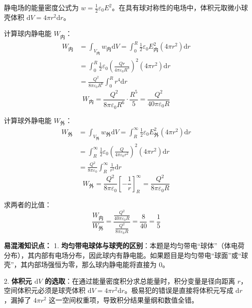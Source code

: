 静电场的能量密度公式为 $w = \frac{1}{2}\varepsilon_0 E^2$。在具有球对称性的电场中，体积元取微小球壳体积 $\mathrm{d}V = 4\pi r^2 \mathrm{d}r$。

计算球内静电能 $W_{\text{内}}$：
\begin{align*}
	W_{\text{内}} &= \int_{V_{\text{内}}} w_{\text{内}} \mathrm{d}V = \int_{0}^{R} \frac{1}{2}\varepsilon_0 E_{\text{内}}^2 (4\pi r^2) \mathrm{d}r \\
	&= \int_{0}^{R} \frac{1}{2}\varepsilon_0 \left( \frac{Qr}{4\pi\varepsilon_0 R^3} \right)^2 (4\pi r^2) \mathrm{d}r \\
	&= \frac{Q^2}{8\pi\varepsilon_0 R^6} \int_{0}^{R} r^4 \mathrm{d}r
\end{align*}
\begin{equation}\label{eq:8-5-3}
	W_{\text{内}} = \frac{Q^2}{8\pi\varepsilon_0 R^6} \cdot \frac{R^5}{5} = \frac{Q^2}{40\pi\varepsilon_0 R}
\end{equation}

计算球外静电能 $W_{\text{外}}$：
\begin{align*}
	W_{\text{外}} &= \int_{V_{\text{外}}} w_{\text{外}} \mathrm{d}V = \int_{R}^{\infty} \frac{1}{2}\varepsilon_0 E_{\text{外}}^2 (4\pi r^2) \mathrm{d}r \\
	&= \int_{R}^{\infty} \frac{1}{2}\varepsilon_0 \left( \frac{Q}{4\pi\varepsilon_0 r^2} \right)^2 (4\pi r^2) \mathrm{d}r \\
	&= \frac{Q^2}{8\pi\varepsilon_0} \int_{R}^{\infty} \frac{1}{r^2} \mathrm{d}r
\end{align*}
\begin{equation}\label{eq:8-5-4}
	W_{\text{外}} = \frac{Q^2}{8\pi\varepsilon_0} \left[ -\frac{1}{r} \right]_{R}^{\infty} = \frac{Q^2}{8\pi\varepsilon_0 R}
\end{equation}

求两者的比值：
\begin{equation}\label{eq:8-5-5}
	\frac{W_{\text{内}}}{W_{\text{外}}} = \frac{\frac{Q^2}{40\pi\varepsilon_0 R}}{\frac{Q^2}{8\pi\varepsilon_0 R}} = \frac{8}{40} = \frac{1}{5}
\end{equation}

\textbf{易混淆知识点： }
1. \textbf{均匀带电球体与球壳的区别}：本题是均匀带电“球体”（体电荷分布），其内部有电场分布，因此球内有静电能。如果题目是均匀带电“球面”或“球壳”，其内部场强恒为零，那么球内静电能将直接为 $0$。

2. \textbf{体积元 $\mathrm{d}V$ 的选取}：在通过能量密度积分求总能量时，积分变量是径向距离 $r$，空间体积元必须是球壳体积 $\mathrm{d}V = 4\pi r^2 \mathrm{d}r$。极易犯的错误是直接将体积元写成 $\mathrm{d}r$，漏掉了 $4\pi r^2$ 这一空间权重项，导致积分结果量纲和数值全错。

